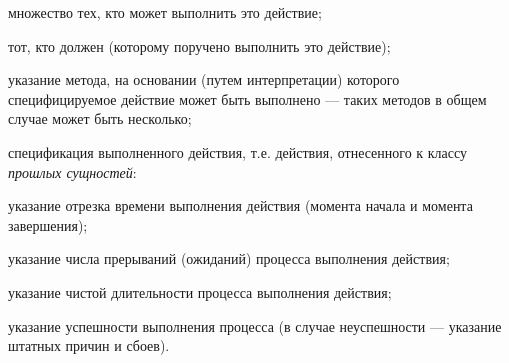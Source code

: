 \begin{SCn}
\begin{scnsubstruct}
{\begin{scnitemize}
                \begin{scnitemizeii}
                    \item множество тех, кто может выполнить это действие;
                    \item тот, кто должен (которому поручено выполнить это действие);
                \end{scnitemizeii}
                \item указание метода, на основании (путем интерпретации) которого специфицируемое действие может быть выполнено --- таких методов в общем случае может быть несколько;
                \item спецификация выполненного действия, т.е. действия, отнесенного к классу \textit{прошлых сущностей}:
                \begin{scnitemizeii}
                    \item указание отрезка времени выполнения действия (момента начала и момента завершения);
                    \item указание числа прерываний (ожиданий) процесса выполнения действия;
                    \item указание чистой длительности процесса выполнения действия;
                    \item указание успешности выполнения процесса (в случае неуспешности --- указание штатных причин и сбоев).
                \end{scnitemizeii}
            \end{scnitemize}}
        

\end{scnsubstruct}
\end{SCn}
